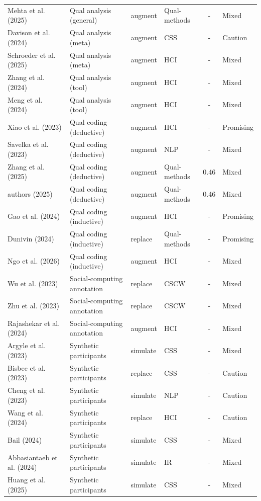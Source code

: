 \begin{longtable}{@{}l l l l c l@{}}
Mehta et al. (2025) & Qual analysis (general) & augment & Qual-methods & - & Mixed \\
Davison et al. (2024) & Qual analysis (meta) & augment & CSS & - & Caution \\
Schroeder et al. (2025) & Qual analysis (meta) & augment & HCI & - & Mixed \\
Zhang et al. (2024) & Qual analysis (tool) & augment & HCI & - & Mixed \\
Meng et al. (2024) & Qual analysis (tool) & augment & HCI & - & Mixed \\
Xiao et al. (2023) & Qual coding (deductive) & augment & HCI & - & Promising \\
Savelka et al. (2023) & Qual coding (deductive) & augment & NLP & - & Mixed \\
Zhang et al. (2025) & Qual coding (deductive) & augment & Qual-methods & 0.46 & Mixed \\
authors (2025) & Qual coding (deductive) & augment & Qual-methods & 0.46 & Mixed \\
Gao et al. (2024) & Qual coding (inductive) & augment & HCI & - & Promising \\
Dunivin (2024) & Qual coding (inductive) & replace & Qual-methods & - & Promising \\
Ngo et al. (2026) & Qual coding (inductive) & augment & HCI & - & Mixed \\
Wu et al. (2023) & Social-computing annotation & replace & CSCW & - & Mixed \\
Zhu et al. (2023) & Social-computing annotation & replace & CSCW & - & Mixed \\
Rajashekar et al. (2024) & Social-computing annotation & augment & HCI & - & Mixed \\
Argyle et al. (2023) & Synthetic participants & simulate & CSS & - & Mixed \\
Bisbee et al. (2023) & Synthetic participants & replace & CSS & - & Caution \\
Cheng et al. (2023) & Synthetic participants & simulate & NLP & - & Caution \\
Wang et al. (2024) & Synthetic participants & replace & HCI & - & Caution \\
Bail (2024) & Synthetic participants & simulate & CSS & - & Mixed \\
Abbasiantaeb et al. (2024) & Synthetic participants & simulate & IR & - & Mixed \\
Huang et al. (2025) & Synthetic participants & simulate & CSS & - & Mixed \\

\end{longtable}

